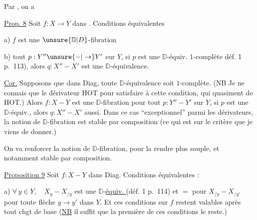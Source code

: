 Par , on a

\uline{Prop. 8} Soit $f:X\to Y$ dans . Conditions équivalentes

a) $f$ est une $\unsure{\mathbb D|D}$-fibration

b)  tout $p:Y''\unsure{\mathord{-}|\to}Y'$ sur $Y$, si $p$ est une $\mathbb D$-équiv. $1$-complète \unsure{(}déf. 1 p.~113), alors $q:X''-X'$ est une $\mathbb D$-équivalence.


\uline{Cor.} Supposons que dans Diag, toute $\mathbb D$-équivalence soit $1$-complète. (NB Je ne connais que le dérivateur HOT pour satisfaire à cette condition, qui  quasiment  de HOT.) Alors $f:X-Y$ est une $\mathbb D$-fibration  pour tout $p:Y''-Y'$ sur $Y$, si $p$ est une $\mathbb D$-équiv., alors $q:X''-X'$ aussi. Dans ce cas ``exceptionnel'' parmi les dérivateurs, la notion de $\mathbb D$-fibration est stable par composition (ce qui est  sur le critère que je viens de donner.)

On va renforcer la notion de $\mathbb D$-fibration, pour la rendre plus souple, et notamment stable par composition.

\uline{Proposition 9} Soit $f:X-Y$ dans Diag. Conditions équivalentes :

a) $\forall\,y\in Y,\quad X_y-X_{/y}$ est une $\mathbb D$-\uline{équiv. } (déf. 1 p.~114) et  $=$ pour $X_{/y}-X_{/y'}$ pour toute flèche $y\longrightarrow y'$ dans $Y$. Et ces conditions sur $f$ restent valables après tout chgt de base (\uline{NB} il suffit que la première de ces conditions le reste.)
